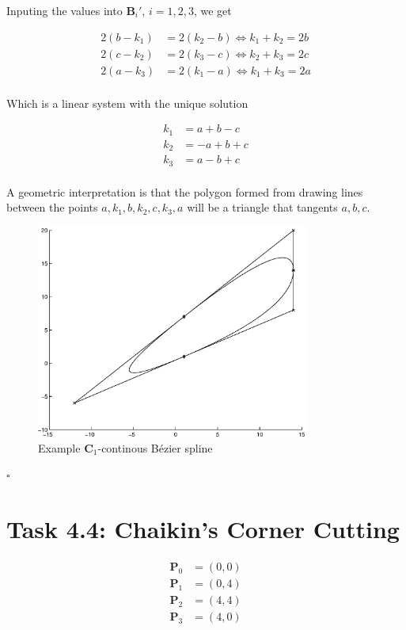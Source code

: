 \documentclass[paper=a4, fontsize=11pt]{scrartcl} %
\numberwithin{equation}{section} %
\numberwithin{figure}{section} %
\numberwithin{table}{section} %
\begin{document}
Inputing the values into $\mathbf{B}_i'$, $i=1,2,3$, we get

\begin{align*}
  2(b-k_1) &= 2(k_2-b) \iff k_1+k_2 = 2b\\
  2(c-k_2) &= 2(k_3-c) \iff k_2+k_3 = 2c\\
  2(a-k_3) &= 2(k_1-a) \iff k_1+k_3 = 2a\\
\end{align*}

Which is a linear system with the unique solution

\begin{align*}
  k_1 &= a+b-c\\
  k_2 &= -a+b+c\\
  k_3 &= a-b+c\\
\end{align*}

A geometric interpretation is that the polygon formed from drawing lines between
the points $a, k_1, b, k_2, c, k_3, a$ will be a triangle that tangents $a,b,c$.

\begin{figure}[H]
  \centering
  \includegraphics[width=0.8\textwidth]{eps}
  \caption{Example $\mathbf{C}_1$-continous B\'ezier spline}
\end{figure} 

\hfill
$\square$

\section*{Task 4.4: Chaikin's Corner Cutting}

\begin{align*}
  \mathbf{P}_0 &= (0,0)\\
  \mathbf{P}_1 &= (0,4)\\
  \mathbf{P}_2 &= (4,4)\\
  \mathbf{P}_3 &= (4,0)\\
\end{align*}
\end{document}
